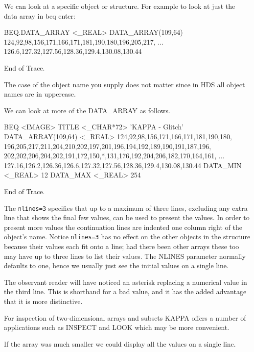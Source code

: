 \documentclass[11pt,nolof]{starlink}
\begin{document}
We can look at a specific object or structure.  For example to look
at just the data array in beq enter:

\small
\begin{terminalv}

BEQ.DATA_ARRAY  <_REAL>
  DATA_ARRAY(109,64)  124,92,98,156,171,166,171,181,190,180,196,205,217,
                      ... 126.6,127.32,127.56,128.36,129.4,130.08,130.44

End of Trace.
\end{terminalv}
\normalsize
The case of the object name you supply does not matter since in HDS all
object names are in uppercase.

We can look at more of the DATA\_ARRAY as follows.

\small
\begin{terminalv}

BEQ  <IMAGE>
  TITLE          <_CHAR*72>      'KAPPA - Glitch'
  DATA_ARRAY(109,64)  <_REAL>    124,92,98,156,171,166,171,181,190,180,
   196,205,217,211,204,210,202,197,201,196,194,192,189,190,191,187,196,
   202,202,206,204,202,191,172,150,*,131,176,192,204,206,182,170,164,161,
   ... 127.16,126.2,126.36,126.6,127.32,127.56,128.36,129.4,130.08,130.44
  DATA_MIN       <_REAL>         12
  DATA_MAX       <_REAL>         254

End of Trace.
\end{terminalv}
\normalsize
The \texttt{nlines=3} specifies that up to a maximum of three lines,
excluding any extra line that shows the final few values, can be
used to present the values.  In order to present more values the
continuation lines are indented one column right of the object's name.
Notice \texttt{nlines=3} has no effect on the other objects in the
structure because their values each fit onto a line; had there been
other arrays these too may have up to three lines to list their
values.  The NLINES parameter normally defaults to one, hence we usually
just see the initial values on a single line.

The observant reader will have noticed an asterisk replacing a numerical
value in the third line.  This is shorthand for a bad value, and it
has the added advantage that it is more distinctive.

For inspection of two-dimensional arrays and subsets {\footnotesize KAPPA}
offers a number of applications such as INSPECT and LOOK which may be
more convenient.

If the array was much smaller we could display all the values on a single
line.
\end{document}
